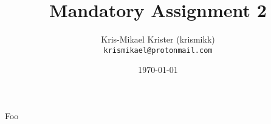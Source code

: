 \documentclass{article}
\title{Mandatory Assignment 2}
\author{Kris-Mikael Krister (krismikk)\\\texttt{krismikael@protonmail.com}}
\date{\today}
\begin{document}
\maketitle

Foo
\end{document}
